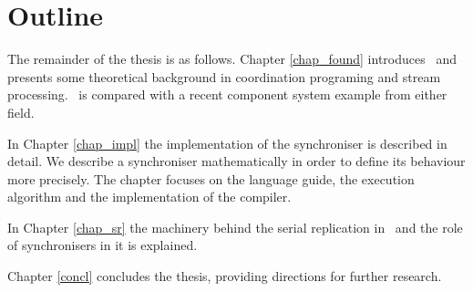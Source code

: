     \section{Outline}
The remainder of the thesis is as follows. Chapter \ref{chap_found} introduces \ak\ and presents some theoretical background in coordination programing and stream processing. \ak\ is compared with a recent component system example from either field.

In Chapter \ref{chap_impl} the implementation of the synchroniser is described in detail. We describe a synchroniser mathematically in order to define its behaviour more precisely. The chapter focuses on the language guide, the execution algorithm and the implementation of the compiler.

In Chapter \ref{chap_sr} the machinery behind the serial replication in \ak\ and the role of synchronisers in it is explained.

Chapter \ref{concl} concludes the thesis, providing directions for further research.
